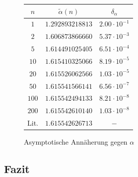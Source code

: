 \documentclass[10pt,a4paper]{article}
\begin{document}
\vspace{-10pt}
\begin{figure}[h]
\begin{minipage}[c]{0.5\textwidth}
\captionsetup{type=figure}
\begin{center}

\vspace{-10pt}
\caption{Asymptotische Annäherung gegen $\alpha$}
\label{plotkonvergenz2d}
\end{center}
\end{minipage}
\begin{minipage}[c]{0.5\textwidth}
\captionsetup{type=table}
\begin{center}
\begin{tabular}{c|c|c}
\rule[-1ex]{0pt}{2.5ex} $n$ & $\tilde{\alpha}(n)$ & $\delta_\alpha$ \\ 
\hline 
\rule[-1ex]{0pt}{2.5ex} $1$ & $1.292893218813$ & $2.00\cdot10^{-1}$ \\ 
\hline 
\rule[-1ex]{0pt}{2.5ex} $2$ & $1.606873866660$ & $5.37\cdot10^{-3}$ \\ 
\hline
\rule[-1ex]{0pt}{2.5ex} $5$ & $1.614491025405$ & $6.51\cdot10^{-4}$ \\ 
\hline 
\rule[-1ex]{0pt}{2.5ex} $10$ & $1.615410325066$ & $8.19\cdot10^{-5}$ \\ 
\hline 
\rule[-1ex]{0pt}{2.5ex} $20$ & $1.615526062566$ & $1.03\cdot10^{-5}$ \\ 
\hline 
\rule[-1ex]{0pt}{2.5ex} $50$ & $1.615541566141$ & $6.56\cdot10^{-7}$ \\
\hline
\rule[-1ex]{0pt}{2.5ex} $100$ & $1.615542494133$ & $8.21\cdot10^{-8}$ \\ 
\hline
\rule[-1ex]{0pt}{2.5ex} $200$ & $1.615542610140$ & $1.03\cdot10^{-8}$ \\ 
\hline
\rule[1ex]{0pt}{2.5ex} Lit.   & $1.615542626713$ & $ - $
\end{tabular}
\label{tab:konvergenz2d}
\end{center}
\end{minipage}
\end{figure}

\subsection{Fazit}
\end{document}
